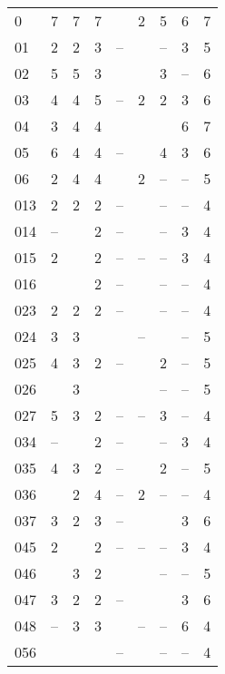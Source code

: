     \centering
    \vspace{-0.75\baselineskip} %


\begin{center}
\begin{supertabular}{l c c c c c c c c}
0    & 7 & 7 & 7 &  & 2 & 5 & 6 & 7 \\

01   & 2 & 2 & 3 & -- &  & -- & 3 & 5 \\
02   & 5 & 5 & 3 &  &  & 3 & -- & 6 \\
03   & 4 & 4 & 5 & -- & 2 & 2 & 3 & 6 \\
04   & 3 & 4 & 4 &  &  &  & 6 & 7 \\
05   & 6 & 4 & 4 & -- &  & 4 & 3 & 6 \\
06   & 2 & 4 & 4 &  & 2 & -- & -- & 5 \\

013  & 2 & 2 & 2 & -- &  & -- & -- & 4 \\
014  & -- &  & 2 & -- &  & -- & 3 & 4 \\
015  & 2 &  & 2 & -- & -- & -- & 3 & 4 \\
016  &  &  & 2 & -- &  & -- & -- & 4 \\
023  & 2 & 2 & 2 & -- &  & -- & -- & 4 \\
024  & 3 & 3 &  &  & -- &  & -- & 5 \\
025  & 4 & 3 & 2 & -- &  & 2 & -- & 5 \\
026  &  & 3 &  &  &  & -- & -- & 5 \\
027  & 5 & 3 & 2 & -- & -- & 3 & -- & 4 \\
034  & -- &  & 2 & -- &  & -- & 3 & 4 \\
035  & 4 & 3 & 2 & -- &  & 2 & -- & 5 \\
036  &  & 2 & 4 & -- & 2 & -- & -- & 4 \\
037  & 3 & 2 & 3 & -- &  &  & 3 & 6 \\
045  & 2 &  & 2 & -- & -- & -- & 3 & 4 \\
046  &  & 3 & 2 &  &  & -- & -- & 5 \\
047  & 3 & 2 & 2 & -- &  &  & 3 & 6 \\
048  & -- & 3 & 3 &  & -- & -- & 6 & 4 \\
056  &  &  &  & -- &  & -- & -- & 4 \\


\end{supertabular}
\end{center}
